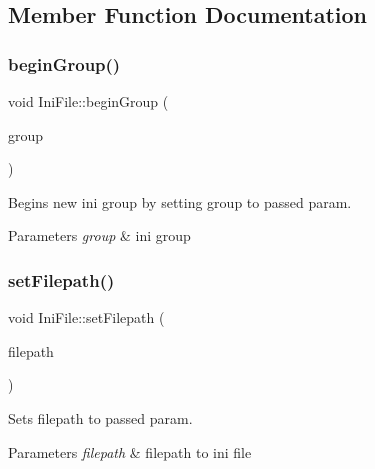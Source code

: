 \subsection{Member Function Documentation}
\mbox{\label{class_ini_file_a9a34c2bebd5c841500a925e0df6674e9}} 
\subsubsection{\texorpdfstring{beginGroup()}{beginGroup()}}
{\footnotesize\ttfamily void Ini\+File\+::begin\+Group (\begin{DoxyParamCaption}\item[{const \mbox{\hyperlink{class_a_string}{A\+String}} \&}]{group }\end{DoxyParamCaption})}



Begins new ini group by setting group to passed param. 


\begin{DoxyParams}{Parameters}
{\em group} & ini group \\
\hline
\end{DoxyParams}
\mbox{\label{class_ini_file_a3b3caa195a0be5077e8575e259ef7e53}} 
\subsubsection{\texorpdfstring{setFilepath()}{setFilepath()}}
{\footnotesize\ttfamily void Ini\+File\+::set\+Filepath (\begin{DoxyParamCaption}\item[{const \mbox{\hyperlink{class_a_string}{A\+String}} \&}]{filepath }\end{DoxyParamCaption})}



Sets filepath to passed param. 


\begin{DoxyParams}{Parameters}
{\em filepath} & filepath to ini file \\
\hline
\end{DoxyParams}
\mbox{\label{class_ini_file_a5d6fe5d2b2364c88376d49115007007f}} 
